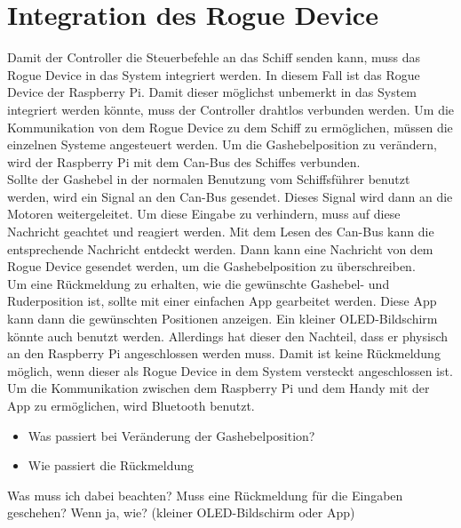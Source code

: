 \section{Integration des Rogue Device}
Damit der Controller die Steuerbefehle an das Schiff senden kann, muss das Rogue Device in das System integriert werden.
In diesem Fall ist das Rogue Device der Raspberry Pi. Damit dieser möglichst unbemerkt in das System integriert werden könnte,
muss der Controller drahtlos verbunden werden. Um die Kommunikation von dem Rogue Device zu dem Schiff zu ermöglichen, müssen
die einzelnen Systeme angesteuert werden. Um die Gashebelposition zu verändern, wird der Raspberry Pi mit dem Can-Bus des Schiffes
verbunden. 
\\
Sollte der Gashebel in der normalen Benutzung vom Schiffsführer benutzt werden, wird ein Signal an den Can-Bus gesendet. Dieses Signal wird dann an die Motoren weitergeleitet.
Um diese Eingabe zu verhindern, muss auf diese Nachricht geachtet und reagiert werden. Mit dem Lesen des Can-Bus kann die 
entsprechende Nachricht entdeckt werden. Dann kann eine Nachricht von dem Rogue Device gesendet werden, um die Gashebelposition
zu überschreiben.
\\
Um eine Rückmeldung zu erhalten, wie die gewünschte Gashebel- und Ruderposition ist, sollte mit einer einfachen App
gearbeitet werden. Diese App kann dann die gewünschten Positionen anzeigen. Ein kleiner OLED-Bildschirm könnte auch benutzt 
werden. Allerdings hat dieser den Nachteil, dass er physisch an den Raspberry Pi angeschlossen werden muss. Damit 
ist keine Rückmeldung möglich, wenn dieser als Rogue Device in dem System versteckt angeschlossen ist.
Um die Kommunikation zwischen dem Raspberry Pi und dem Handy mit der App zu ermöglichen, wird Bluetooth benutzt.


\begin{itemize}
    \item Was passiert bei Veränderung der Gashebelposition?
    \item Wie passiert die Rückmeldung
\end{itemize}
Was muss ich dabei beachten?
Muss eine Rückmeldung für die Eingaben geschehen? Wenn ja, wie?
(kleiner OLED-Bildschirm oder App)
